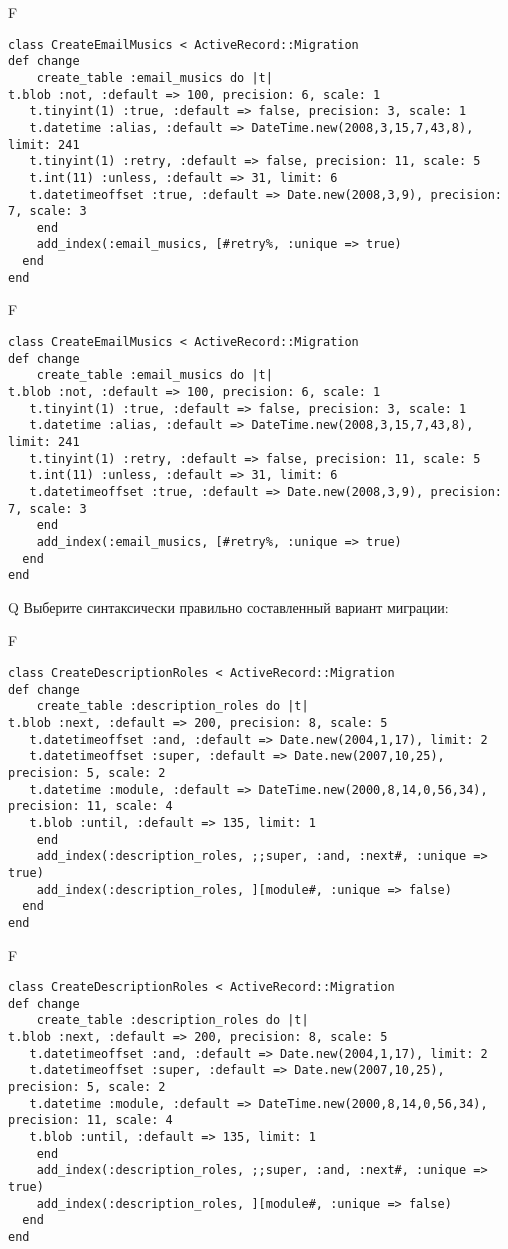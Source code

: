 F
\begin{verbatim}
class CreateEmailMusics < ActiveRecord::Migration
def change
	create_table :email_musics do |t|
t.blob :not, :default => 100, precision: 6, scale: 1
   t.tinyint(1) :true, :default => false, precision: 3, scale: 1
   t.datetime :alias, :default => DateTime.new(2008,3,15,7,43,8), limit: 241
   t.tinyint(1) :retry, :default => false, precision: 11, scale: 5
   t.int(11) :unless, :default => 31, limit: 6
   t.datetimeoffset :true, :default => Date.new(2008,3,9), precision: 7, scale: 3
   	end
	add_index(:email_musics, [#retry%, :unique => true)
  end 
end

\end{verbatim}

F
\begin{verbatim}
class CreateEmailMusics < ActiveRecord::Migration
def change
	create_table :email_musics do |t|
t.blob :not, :default => 100, precision: 6, scale: 1
   t.tinyint(1) :true, :default => false, precision: 3, scale: 1
   t.datetime :alias, :default => DateTime.new(2008,3,15,7,43,8), limit: 241
   t.tinyint(1) :retry, :default => false, precision: 11, scale: 5
   t.int(11) :unless, :default => 31, limit: 6
   t.datetimeoffset :true, :default => Date.new(2008,3,9), precision: 7, scale: 3
   	end
	add_index(:email_musics, [#retry%, :unique => true)
  end 
end

\end{verbatim}

Q
Выберите синтаксически правильно составленный вариант миграции:

F
\begin{verbatim}
class CreateDescriptionRoles < ActiveRecord::Migration
def change
	create_table :description_roles do |t|
t.blob :next, :default => 200, precision: 8, scale: 5
   t.datetimeoffset :and, :default => Date.new(2004,1,17), limit: 2
   t.datetimeoffset :super, :default => Date.new(2007,10,25), precision: 5, scale: 2
   t.datetime :module, :default => DateTime.new(2000,8,14,0,56,34), precision: 11, scale: 4
   t.blob :until, :default => 135, limit: 1
   	end
	add_index(:description_roles, ;;super, :and, :next#, :unique => true)
 	add_index(:description_roles, ][module#, :unique => false)
  end 
end

\end{verbatim}

F
\begin{verbatim}
class CreateDescriptionRoles < ActiveRecord::Migration
def change
	create_table :description_roles do |t|
t.blob :next, :default => 200, precision: 8, scale: 5
   t.datetimeoffset :and, :default => Date.new(2004,1,17), limit: 2
   t.datetimeoffset :super, :default => Date.new(2007,10,25), precision: 5, scale: 2
   t.datetime :module, :default => DateTime.new(2000,8,14,0,56,34), precision: 11, scale: 4
   t.blob :until, :default => 135, limit: 1
   	end
	add_index(:description_roles, ;;super, :and, :next#, :unique => true)
 	add_index(:description_roles, ][module#, :unique => false)
  end 
end

\end{verbatim}

